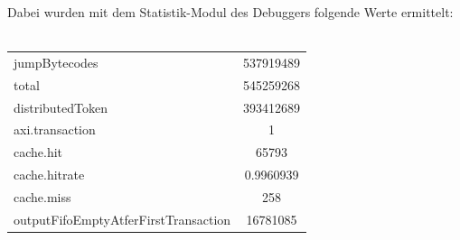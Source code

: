 Dabei wurden mit dem Statistik-Modul des Debuggers folgende Werte ermittelt:\\\\
\begin{tabular}{lc}
jumpBytecodes & 537919489\\
total & 545259268 \\
distributedToken & 393412689 \\
axi.transaction& 1\\
cache.hit & 65793\\
cache.hitrate& 0.9960939\\
cache.miss& 258\\
outputFifoEmptyAtferFirstTransaction & 16781085
\end{tabular}






 

 